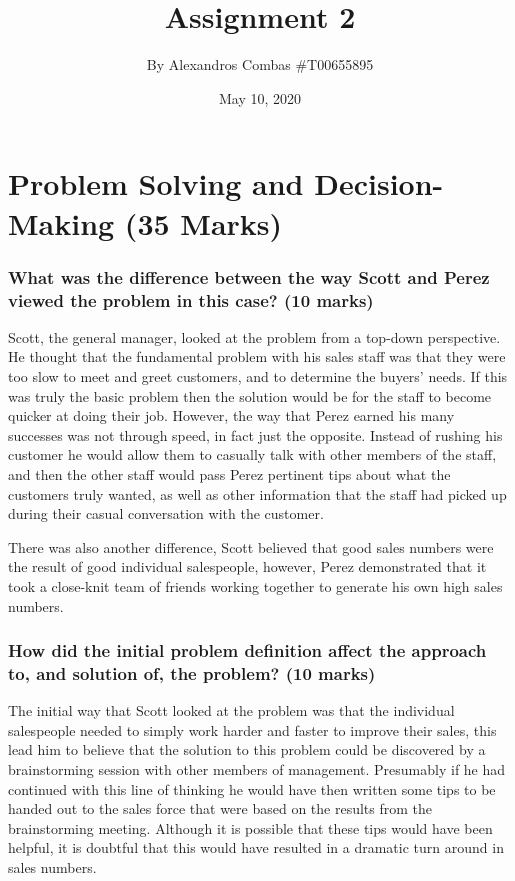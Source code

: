 \documentclass[12pt,titlepage]{article}
\begin{document}
\title{\Huge{\textbf{Assignment 2}}}
\author{By Alexandros Combas \#T00655895}
\date{May 10, 2020}
\maketitle


\renewcommand\thepart{\Alph{part}}
\part{Problem Solving and Decision-Making (35 Marks)}

\section{What was the difference between the way Scott and Perez viewed the problem in this case? (10 marks)}
	
Scott, the general manager, looked at the problem from a top-down perspective. He thought that the fundamental problem with his sales staff was that they were too slow to meet and greet customers, and to determine the buyers' needs. If this was truly the basic problem then the solution would be for the staff to become quicker at doing their job. However, the way that Perez earned his many successes was not through speed, in fact just the opposite. Instead of rushing his customer he would allow them to casually talk with other members of the staff, and then the other staff would pass Perez pertinent tips about what the customers truly wanted, as well as other information that the staff had picked up during their casual conversation with the customer.

There was also another difference, Scott believed that good sales
numbers were the result of good individual salespeople, however, Perez demonstrated that it took a close-knit team of friends working together to generate his own high sales numbers.

\section{How did the initial problem definition affect the approach to, and solution of, the problem? (10 marks)}

The initial way that Scott looked at the problem was that the individual salespeople needed to simply work harder and faster to improve their sales, this lead him to believe that the solution to this problem could be discovered by a brainstorming session with other members of management. Presumably if he had continued with this line of thinking he would have then written some tips to be handed out to the sales force that were based on the results from the brainstorming meeting. Although it is possible that these tips would have been helpful, it is doubtful that this would have resulted in a dramatic turn around in sales numbers.
\end{document}
